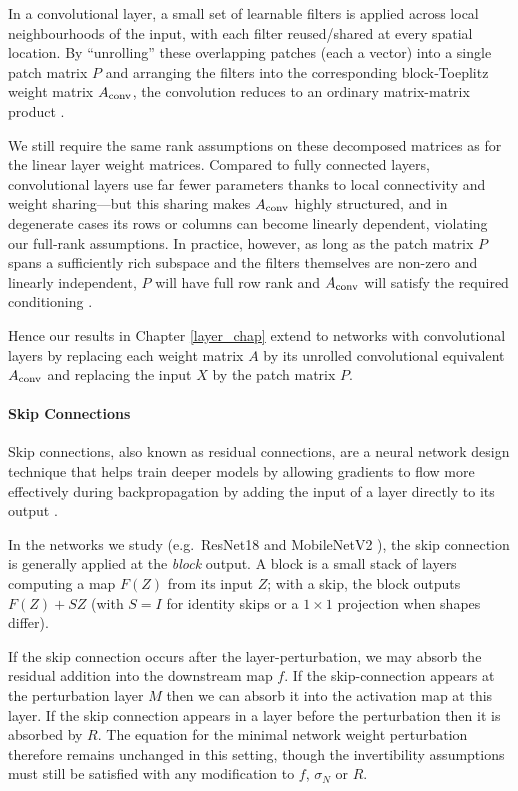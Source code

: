 \documentclass{article}
\theoremstyle{plain}
\theoremstyle{definition}
\theoremstyle{remark}
\begin{document}
In a convolutional layer, a small set of learnable filters is applied across local neighbourhoods of the input, with each filter reused/shared at every spatial location.  By “unrolling” these overlapping patches (each a vector) into a single patch matrix \(P\) and arranging the filters into the corresponding block‐Toeplitz weight matrix \(A_{\rm conv}\), the convolution reduces to an ordinary matrix-matrix product \cite{vasudevan_parallel_2017}.

We still require the same rank assumptions on these decomposed matrices as for the linear layer weight matrices.  Compared to fully connected layers, convolutional layers use far fewer parameters thanks to local connectivity and weight sharing—but this sharing makes \(A_{\rm conv}\) highly structured, and in degenerate cases its rows or columns can become linearly dependent, violating our full‐rank assumptions.  In practice, however, as long as the patch matrix \(P\) spans a sufficiently rich subspace and the filters themselves are non-zero and linearly independent, \(P\) will have full row rank and \(A_{\rm conv}\) will satisfy the required conditioning \cite{sedghi_singular_2019}.

Hence our results in Chapter \ref{layer_chap} extend to networks with convolutional layers by replacing each weight matrix \(A\) by its unrolled convolutional equivalent \(A_{\rm conv}\) and replacing the input \(X\) by the patch matrix \(P\).

\paragraph{Skip Connections}

Skip connections, also known as residual connections, are a neural network design technique that helps train deeper models by allowing gradients to flow more effectively during backpropagation by adding the input of a layer directly to its output \cite{he_deep_2016}.

In the networks we study (e.g.\ ResNet18 \cite{he_deep_2016} and MobileNetV2 \cite{sandler_mobilenetv2_2019}), the skip connection is generally applied at the \emph{block} output.  
A block is a small stack of layers computing a map \(F(Z)\) from its input \(Z\); with a skip, the block outputs \(F(Z)+S Z\) (with \(S=I\) for identity skips or a \(1{\times}1\) projection when shapes differ).   

If the skip connection occurs after the layer-perturbation, we
 may absorb the residual addition into the downstream map $f$. If the skip-connection appears at the perturbation layer $M$ then we can absorb it into the activation map at this layer. If the skip connection appears in a layer before the perturbation then it is absorbed by $R$. The equation for the minimal network weight perturbation therefore remains unchanged in this setting, though the invertibility assumptions must still be satisfied with any modification to $f$, $\sigma_N$ or $R$.
 
\end{document}
